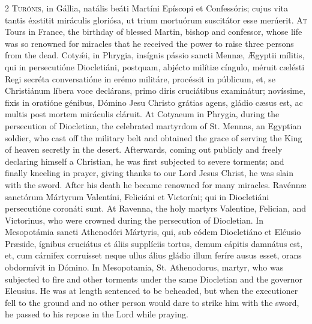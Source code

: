 \begin{paracol}{2}
\lettrine[lines=2]{T}{urónis,} in Gállia, 
 natális beáti Martíni Epíscopi et Confessóris; cujus vita tantis éxstitit 
 miráculis gloriósa, ut trium mortuórum suscitátor esse merúerit.
\switchcolumn
{}
\lettrine[lines=2]{A}{t} Tours in France, the birthday of 
 blessed Martin, bishop and confessor, whose life was so renowned for 
 miracles that he received the power to raise three persons from the dead.
\switchcolumn*
{}
Cotyǽi, in Phrygia, 
 insígnis pássio sancti Mennæ, Ægyptii mílitis, qui in persecutióne 
 Diocletiáni, postquam, abjécto milítiæ cíngulo, méruit cælésti Regi secréta 
 conversatióne in erémo militáre, procéssit in públicum, et, se Christiánum 
 líbera voce declárans, primo diris cruciátibus examinátur; novíssime, fixis 
 in oratióne génibus, Dómino Jesu Christo grátias agens, gládio cæsus est, ac 
 multis post mortem miráculis cláruit.
\switchcolumn
{}
At Cotyaeum in Phrygia, during the 
 persecution of Diocletian, the celebrated martyrdom of St. Mennas, an 
 Egyptian soldier, who cast off the military belt and obtained the grace of 
 serving the King of heaven secretly in the desert. Afterwards, coming 
 out publicly and freely declaring himself a Christian, he was first 
 subjected to severe torments; and finally kneeling in prayer, giving thanks 
 to our Lord Jesus Christ, he was slain with the sword. After his death 
 he became renowned for many miracles.
\switchcolumn*
{}
Ravénnæ sanctórum 
 Mártyrum Valentíni, Feliciáni et Victoríni; qui in Diocletiáni persecutióne 
 coronáti sunt.
\switchcolumn
{}
At Ravenna, the holy martyrs 
 Valentine, Felician, and Victorinus, who were crowned during the persecution 
 of Diocletian.
\switchcolumn*
{}
In Mesopotámia sancti 
 Athenodóri Mártyris, qui, sub eódem Diocletiáno et Eléusio Præside, ígnibus 
 cruciátus et áliis supplíciis tortus, demum cápitis damnátus est, et, cum 
 cárnifex corruísset neque ullus álius gládio illum feríre ausus esset, orans 
 obdormívit in Dómino.
\switchcolumn
{}
In Mesopotamia, St. Athenodorus, 
 martyr, who was subjected to fire and other torments under the same 
 Diocletian and the governor Eleusius. He was at length sentenced to be 
 beheaded, but when the executioner fell to the ground and no other person 
 would dare to strike him with the sword, he passed to his repose in the Lord 
 while praying.
\switchcolumn*
{}

\end{paracol}
